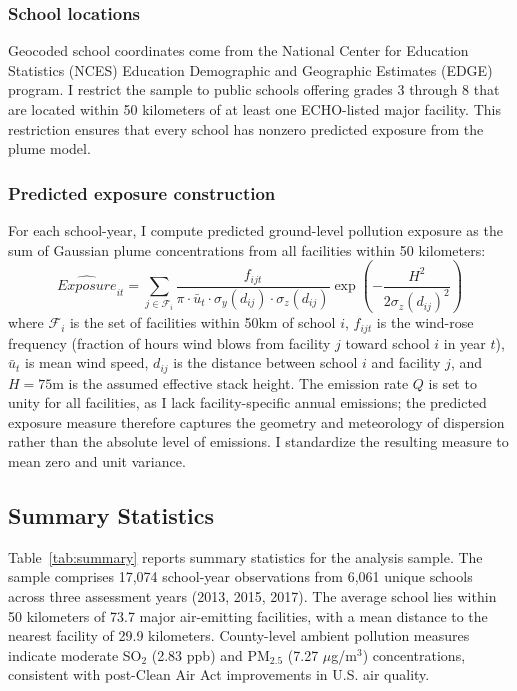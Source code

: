 \documentclass[12pt]{article}
\begin{document}
\subsubsection*{School locations} Geocoded school coordinates come from the National Center for Education Statistics (NCES) Education Demographic and Geographic Estimates (EDGE) program. I restrict the sample to public schools offering grades 3 through 8 that are located within 50 kilometers of at least one ECHO-listed major facility. This restriction ensures that every school has nonzero predicted exposure from the plume model.

\subsubsection*{Predicted exposure construction} For each school-year, I compute predicted ground-level pollution exposure as the sum of Gaussian plume concentrations from all facilities within 50 kilometers:
\begin{equation}
\widehat{Exposure}_{it} = \sum_{j \in \mathcal{F}_i} \frac{f_{ijt}}{\pi \cdot \bar{u}_t \cdot \sigma_y(d_{ij}) \cdot \sigma_z(d_{ij})} \exp\left(-\frac{H^2}{2\sigma_z(d_{ij})^2}\right)
\label{eq:exposure}
\end{equation}
where $\mathcal{F}_i$ is the set of facilities within 50km of school $i$, $f_{ijt}$ is the wind-rose frequency (fraction of hours wind blows from facility $j$ toward school $i$ in year $t$), $\bar{u}_t$ is mean wind speed, $d_{ij}$ is the distance between school $i$ and facility $j$, and $H = 75$m is the assumed effective stack height. The emission rate $Q$ is set to unity for all facilities, as I lack facility-specific annual emissions; the predicted exposure measure therefore captures the geometry and meteorology of dispersion rather than the absolute level of emissions. I standardize the resulting measure to mean zero and unit variance.

\subsection{Summary Statistics}



Table~\ref{tab:summary} reports summary statistics for the analysis sample. The sample comprises 17,074 school-year observations from 6,061 unique schools across three assessment years (2013, 2015, 2017). The average school lies within 50 kilometers of 73.7 major air-emitting facilities, with a mean distance to the nearest facility of 29.9 kilometers. County-level ambient pollution measures indicate moderate SO$_2$ (2.83 ppb) and PM$_{2.5}$ (7.27 $\mu$g/m$^3$) concentrations, consistent with post-Clean Air Act improvements in U.S. air quality.
\end{document}
